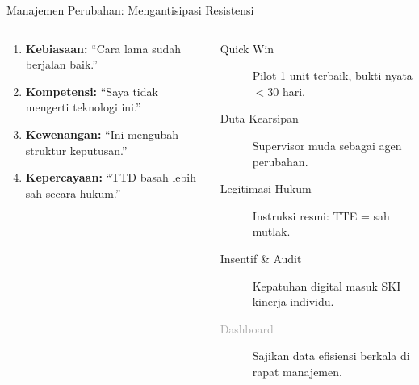 \documentclass[aspectratio=169,11pt]{beamer}
\begin{document}
\begin{frame}{Manajemen Perubahan: Mengantisipasi Resistensi}
    \vspace{0.2cm}
    \begin{columns}[T]
        \begin{orangebox}
            \scriptsize
            \begin{enumerate}
                \item \textbf{Kebiasaan:} ``Cara lama sudah berjalan baik.''
                \item \textbf{Kompetensi:} ``Saya tidak mengerti teknologi ini.''
                \item \textbf{Kewenangan:} ``Ini mengubah struktur keputusan.''
                \item \textbf{Kepercayaan:} ``TTD basah lebih sah secara hukum.''
            \end{enumerate}
        \end{orangebox}
        
        \begin{premiumbox}
            \scriptsize
            \begin{description}
                \item[\textcolor{plnblue}{Quick Win}] Pilot 1 unit terbaik, bukti nyata $<$30 hari.
                \item[\textcolor{plncyan}{Duta Kearsipan}] Supervisor muda sebagai agen perubahan.
                \item[\textcolor{plnorange}{Legitimasi Hukum}] Instruksi resmi: TTE = sah mutlak.
                \item[\textcolor{plngreen}{Insentif \& Audit}] Kepatuhan digital masuk SKI kinerja individu.
                \item[\textcolor{darkgrey}{Dashboard}] Sajikan data efisiensi berkala di rapat manajemen.
            \end{description}
        \end{premiumbox}
    \end{columns}
\end{frame}
\end{document}
